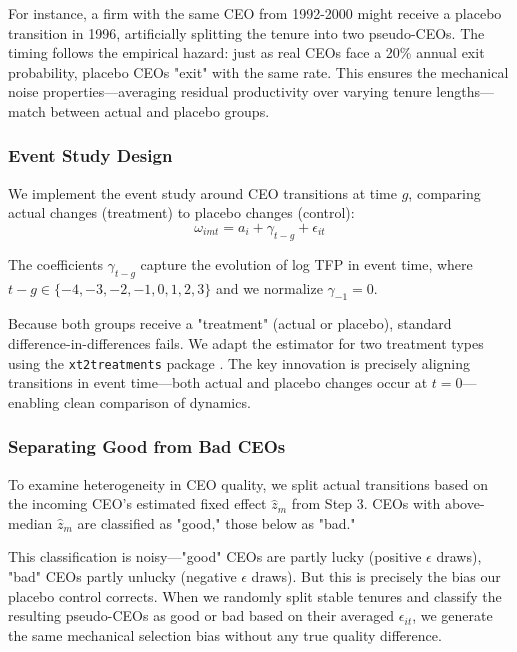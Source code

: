 \documentclass[11pt,a4paper]{article}
\begin{document}
For instance, a firm with the same CEO from 1992-2000 might receive a placebo transition in 1996, artificially splitting the tenure into two pseudo-CEOs. The timing follows the empirical hazard: just as real CEOs face a 20\% annual exit probability, placebo CEOs "exit" with the same rate. This ensures the mechanical noise properties—averaging residual productivity over varying tenure lengths—match between actual and placebo groups.

\subsubsection{Event Study Design}

We implement the event study around CEO transitions at time $g$, comparing actual changes (treatment) to placebo changes (control):
\begin{equation}
\omega_{imt} = a_i + \gamma_{t-g} + \epsilon_{it}
\end{equation}

The coefficients $\gamma_{t-g}$ capture the evolution of log TFP in event time, where $t-g \in \{-4, -3, -2, -1, 0, 1, 2, 3\}$ and we normalize $\gamma_{-1} = 0$.

Because both groups receive a "treatment" (actual or placebo), standard difference-in-differences fails. We adapt the \citet{Callaway2021JoLE} estimator for two treatment types using the \texttt{xt2treatments} package \citep{Koren2024xt2treatments}. The key innovation is precisely aligning transitions in event time—both actual and placebo changes occur at $t=0$—enabling clean comparison of dynamics.

\subsubsection{Separating Good from Bad CEOs}

To examine heterogeneity in CEO quality, we split actual transitions based on the incoming CEO's estimated fixed effect $\hat{z}_m$ from Step 3. CEOs with above-median $\hat{z}_m$ are classified as "good," those below as "bad."

This classification is noisy—"good" CEOs are partly lucky (positive $\epsilon$ draws), "bad" CEOs partly unlucky (negative $\epsilon$ draws). But this is precisely the bias our placebo control corrects. When we randomly split stable tenures and classify the resulting pseudo-CEOs as good or bad based on their averaged $\epsilon_{it}$, we generate the same mechanical selection bias without any true quality difference.
\end{document}
